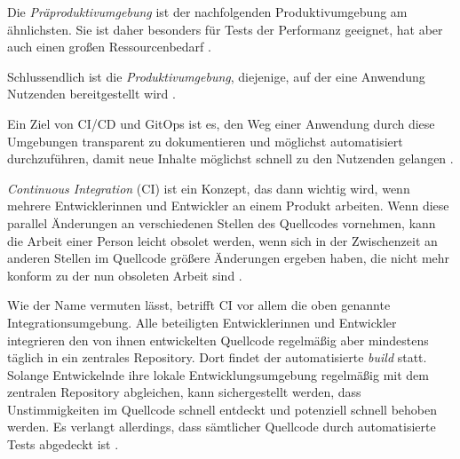 \documentclass[11pt,a4paper]{article}
\begin{document}
Die \emph{Präproduktivumgebung} ist der nachfolgenden Produktivumgebung am ähnlichsten.
Sie ist daher besonders für Tests der Performanz geeignet, hat
aber auch einen großen Ressourcenbedarf \cite{Schmeling_Dargatz_2022}.

Schlussendlich ist die \emph{Produktivumgebung}, diejenige, auf der eine Anwendung
Nutzenden bereitgestellt wird \cite{Schmeling_Dargatz_2022}.


Ein Ziel von CI/CD und GitOps ist es, den Weg einer Anwendung durch
diese Umgebungen transparent zu dokumentieren und möglichst automatisiert
durchzuführen, damit neue Inhalte möglichst schnell zu den
Nutzenden gelangen \cite{cicd_with_kubernetes}.

\emph{Continuous Integration} (CI) ist ein Konzept, das dann wichtig wird, wenn mehrere
Entwicklerinnen und Entwickler an einem Produkt arbeiten.
Wenn diese parallel Änderungen an verschiedenen Stellen des Quellcodes
vornehmen, kann die Arbeit einer Person leicht obsolet werden,
wenn sich in der Zwischenzeit an anderen Stellen im Quellcode größere
Änderungen ergeben haben, die nicht mehr konform zu der nun obsoleten Arbeit sind \cite{fowler_Continuous_Integration}.

Wie der Name vermuten lässt, betrifft CI vor allem die oben genannte Integrationsumgebung.
Alle beteiligten Entwicklerinnen und Entwickler integrieren den von ihnen
entwickelten Quellcode regelmäßig aber mindestens täglich in ein zentrales
Repository. Dort findet der automatisierte \emph{build} statt.
Solange Entwickelnde ihre lokale Entwicklungsumgebung regelmäßig mit dem
zentralen Repository abgleichen, kann sichergestellt werden, dass
Unstimmigkeiten im Quellcode schnell entdeckt und potenziell schnell behoben werden.
Es verlangt allerdings, dass sämtlicher Quellcode durch automatisierte
Tests abgedeckt ist \cite{fowler_Continuous_Integration}.
\end{document}
